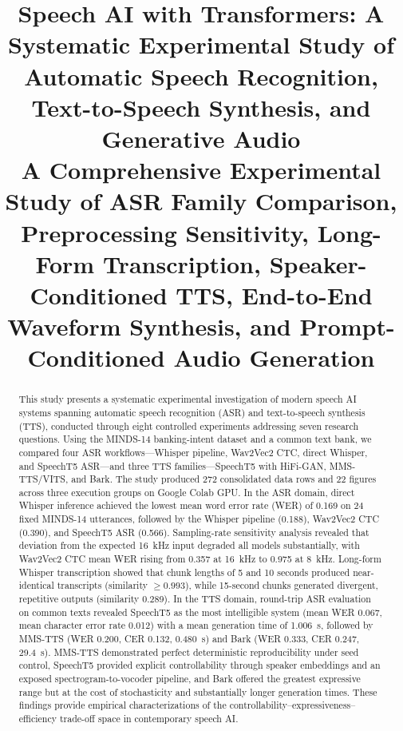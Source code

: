 \documentclass[conference]{IEEEtran}
\begin{document}

\title{Speech AI with Transformers: A Systematic Experimental Study of Automatic Speech Recognition, Text-to-Speech Synthesis, and Generative Audio\\
{\footnotesize A Comprehensive Experimental Study of ASR Family Comparison, Preprocessing Sensitivity, Long-Form Transcription, Speaker-Conditioned TTS, End-to-End Waveform Synthesis, and Prompt-Conditioned Audio Generation}
}

\author{
}

\maketitle

\begin{abstract}
This study presents a systematic experimental investigation of modern speech AI systems spanning automatic speech recognition (ASR) and text-to-speech synthesis (TTS), conducted through eight controlled experiments addressing seven research questions. Using the MINDS-14 banking-intent dataset and a common text bank, we compared four ASR workflows---Whisper pipeline, Wav2Vec2 CTC, direct Whisper, and SpeechT5 ASR---and three TTS families---SpeechT5 with HiFi-GAN, MMS-TTS/VITS, and Bark. The study produced 272 consolidated data rows and 22 figures across three execution groups on Google Colab GPU. In the ASR domain, direct Whisper inference achieved the lowest mean word error rate (WER) of 0.169 on 24 fixed MINDS-14 utterances, followed by the Whisper pipeline (0.188), Wav2Vec2 CTC (0.390), and SpeechT5 ASR (0.566). Sampling-rate sensitivity analysis revealed that deviation from the expected 16~kHz input degraded all models substantially, with Wav2Vec2 CTC mean WER rising from 0.357 at 16~kHz to 0.975 at 8~kHz. Long-form Whisper transcription showed that chunk lengths of 5 and 10 seconds produced near-identical transcripts (similarity $\geq 0.993$), while 15-second chunks generated divergent, repetitive outputs (similarity 0.289). In the TTS domain, round-trip ASR evaluation on common texts revealed SpeechT5 as the most intelligible system (mean WER 0.067, mean character error rate 0.012) with a mean generation time of 1.006~s, followed by MMS-TTS (WER 0.200, CER 0.132, 0.480~s) and Bark (WER 0.333, CER 0.247, 29.4~s). MMS-TTS demonstrated perfect deterministic reproducibility under seed control, SpeechT5 provided explicit controllability through speaker embeddings and an exposed spectrogram-to-vocoder pipeline, and Bark offered the greatest expressive range but at the cost of stochasticity and substantially longer generation times. These findings provide empirical characterizations of the controllability--expressiveness--efficiency trade-off space in contemporary speech AI.
\end{abstract}
\end{document}
